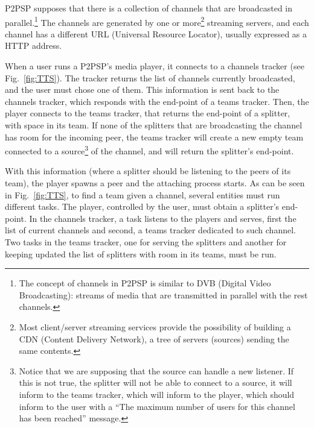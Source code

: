 \label{sec:TTS}
\begin{figure*}
   \caption{Entities and procedures involved in the
    process of determing a splitter (i.e. a team with room for an
    incoming peer) for a given channel.\label{fig:TTS}}
\end{figure*}

P2PSP supposes that there is a collection of channels that are
broadcasted in parallel.\footnote{The concept of channels in P2PSP is
  similar to DVB (Digital Video Broadcasting): streams of media that
  are transmitted in parallel with the rest channels.} The channels
are generated by one or more\footnote{Most client/server streaming
  services provide the possibility of building a CDN (Content Delivery
  Network), a tree of servers (sources) sending the same contents.}
streaming servers, and each channel has a different URL (Universal
Resource Locator), usually expressed as a HTTP address.

When a user runs a P2PSP's media player, it connects to a channels
tracker (see Fig.~\ref{fig:TTS}). The tracker returns the list of
channels currently broadcasted, and the user must chose one of
them. This information is sent back to the channels tracker, which
responds with the end-point of a teams tracker. Then, the player
connects to the teams tracker, that returns the end-point of a
splitter, with space in its team. If none of the splitters that are
broadcasting the channel has room for the incoming peer, the teams
tracker will create a new empty team connected to a
source\footnote{Notice that we are supposing that the source can
  handle a new listener. If this is not true, the splitter will not be
  able to connect to a source, it will inform to the teams tracker,
  which will inform to the player, which should inform to the user
  with a ``The maximum number of users for this channel has been
  reached'' message.} of the channel, and will return the splitter's
end-point.

With this information (where a splitter should be listening to the
peers of its team), the player spawns a peer and the attaching process
starts. As can be seen in Fig.~\ref{fig:TTS}, to find a team given a
channel, several entities must run different tasks. The player,
controlled by the user, must obtain a splitter's end-point. In the
channels tracker, a task listens to the players and serves, first the
list of current channels and second, a teams tracker dedicated to such
channel. Two tasks in the teams tracker, one for serving the splitters
and another for keeping updated the list of splitters with room in its
teams, must be run.
